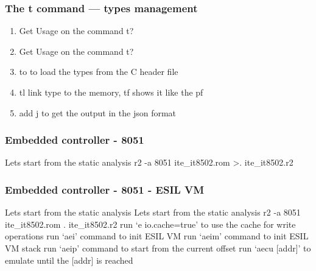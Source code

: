 \documentclass[10pt,pdf,utf8,english,compress,hyperref={unicode}]{beamer}
\begin{document}
\begin{frame}[fragile]
  \frametitle{The t command — types management}
  \begin{enumerate}
\ifxetex
  \item Get Usage on the command \alert{t?}
\else
  \item Get Usage on the command \alert{t?} 
\fi
  \item \alert{to} to load the types from the C header file
  \item \alert{tl} link type to the memory, \alert{tf} shows it like the pf
  \item add \alert{j} to get the output in the json format
 \end{enumerate}
\end{frame}




\begin{frame}[fragile]
  \frametitle{Embedded controller - 8051}
  \center Lets start from the static analysis
  \center r2 -a 8051 ite\_it8502.rom
  \center >. ite\_it8502.r2
\end{frame}


\begin{frame}[fragile]
  \frametitle{Embedded controller - 8051 - ESIL VM}
\ifxetex
  \center Lets start from the static analysis
\else
  \center Lets start from the static analysis 
\fi
  \center r2 -a 8051 ite\_it8502.rom
  \center . ite\_it8502.r2
  \center run `e io.cache=true' to use the cache for write operations
  \center run `aei' command to init ESIL VM
  \center run `aeim' command to init ESIL VM stack
  \center run `aeip' command to start from the current offset
  \center run `aecu [addr]' to emulate until the [addr] is reached
\end{frame}
\end{document}
